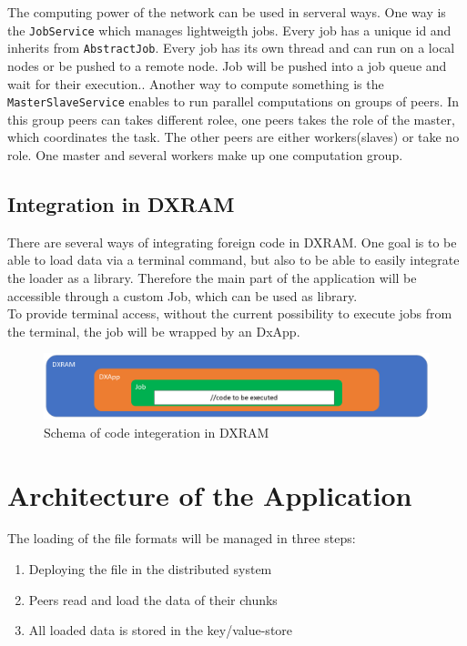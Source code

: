 The computing power of the network can be used in serveral ways. One way is the \texttt{JobService} which manages lightweigth jobs. Every job has a unique id and inherits from \texttt{AbstractJob}. Every job has its own thread and can run on a local nodes or be pushed to a remote node. Job will be pushed into a job queue and wait for their execution.. Another way to compute something is the \texttt{MasterSlaveService} enables to run parallel computations on groups of peers. In this group peers can takes different rolee, one peers takes the role of the master, which coordinates the task. The other peers are either workers(slaves) or take no role. One master and several workers make up one computation group.\cite{Beineke.20180714,dxramoverview}

\subsection{Integration in DXRAM}
There are several ways of integrating foreign code in DXRAM. One goal is to be able to load data via a terminal command, but also to be able to easily integrate the loader as a library. Therefore the main part of the application will be accessible through a custom Job, which can be used as library.\\
To provide terminal access, without the current possibility to execute jobs from the terminal, the job will be wrapped by an DxApp.

\begin{figure}[H]
	\centering
	\includegraphics[width=1.0\linewidth]{img/schema.png}
	\caption{Schema of  code integeration in DXRAM}
	\label{topology}
\end{figure}

\section{Architecture of the Application}
The loading of the file formats will be managed in three steps:
\begin{enumerate}
\item Deploying the file in the distributed system 
\item Peers read and load the data of their chunks
\item All loaded data is stored in the key/value-store
\end{enumerate}

